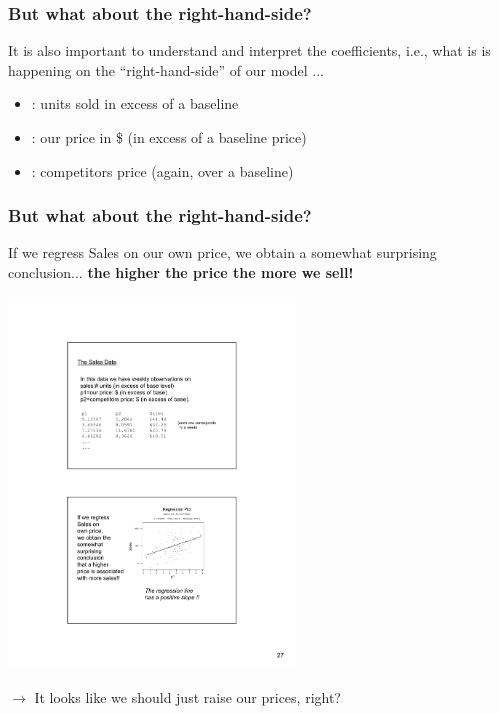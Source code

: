 \documentclass{beamer}
\newcommand{\sk}{\vspace{.5cm}}
\begin{document}
\begin{frame}
\frametitle{But what about the right-hand-side?}

It is also important to understand and interpret the coefficients, i.e., what is is happening on the ``right-hand-side'' of our model ... \sk

\begin{itemize}
\item {\color{burntorange}{\bf Sales}} : units sold in excess of a baseline
\item {\color{burntorange}{\bf P1}}: our price in \$ (in excess of a baseline price)
\item {\color{burntorange}{\bf P2}}: competitors price (again, over a baseline)
\end{itemize}



\end{frame}

\begin{frame}
\frametitle{But what about the right-hand-side?}


If we regress Sales on our own price, we obtain a somewhat surprising conclusion... {\color{burntorange}\bf the higher the price the more we sell!}

\vspace{2mm}
\hspace*{10mm}\includegraphics[width=3in]{figures/Sales1}





$\rightarrow$ It looks like we should just raise our prices, right?

\end{frame}
\end{document}
